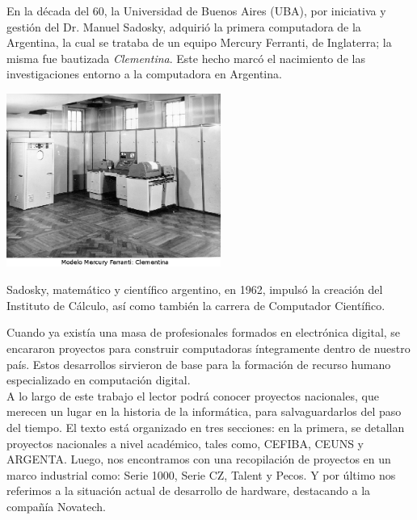 \documentclass[%
  	final,
%
	notitlepage,
	narroweqnarray,
	inline,
 	twoside,
	]{ieee}
\begin{document}
En la d\'ecada del 60, la Universidad de Buenos Aires (UBA), por iniciativa y gesti\'on del Dr. Manuel Sadosky, adquiri\'o la primera computadora de la Argentina, la cual se trataba de un equipo Mercury Ferranti, de Inglaterra; la misma fue bautizada \textit{Clementina}. Este hecho marc\'o el nacimiento de las investigaciones entorno a la computadora en Argentina.\\

\begin{center}\includegraphics[width=199pt, height=161pt]{clementina.png}\end{center} %

Sadosky, matem\'atico y cient\'ifico argentino, en 1962, impuls\'o la creaci\'on del Instituto de C\'alculo, as\'i como tambi\'en la carrera de Computador Cient\'ifico.

Cuando ya exist\'ia una masa de profesionales formados en electr\'onica digital, se encararon proyectos para construir computadoras \'integramente dentro de nuestro pa\'is. Estos desarrollos sirvieron de base para la formaci\'on de recurso humano especializado en computaci\'on digital.\\

A lo largo de este trabajo el lector podr\'a conocer proyectos nacionales, que merecen un lugar en la historia de la inform\'atica, para salvaguardarlos del paso del tiempo. El texto est\'a organizado en tres secciones: en la primera, se detallan proyectos nacionales a nivel acad\'emico, tales como, CEFIBA, CEUNS y ARGENTA. Luego, nos encontramos con una recopilaci\'on de proyectos en un marco industrial como: Serie 1000, Serie CZ, Talent y Pecos. Y por \'ultimo nos referimos a la situaci\'on actual de desarrollo de hardware, destacando a la compa\~n\'ia Novatech.



\end{document}
